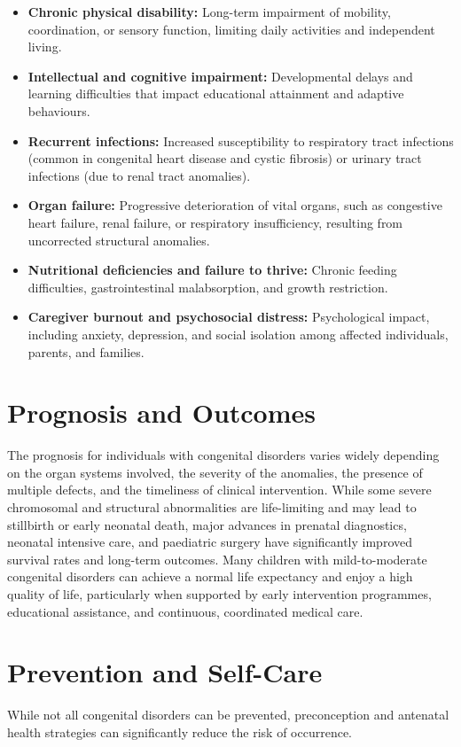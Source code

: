 \begin{itemize}
    \item \textbf{Chronic physical disability:} Long-term impairment of mobility, coordination, or sensory function, limiting daily activities and independent living.
    \item \textbf{Intellectual and cognitive impairment:} Developmental delays and learning difficulties that impact educational attainment and adaptive behaviours.
    \item \textbf{Recurrent infections:} Increased susceptibility to respiratory tract infections (common in congenital heart disease and cystic fibrosis) or urinary tract infections (due to renal tract anomalies).
    \item \textbf{Organ failure:} Progressive deterioration of vital organs, such as congestive heart failure, renal failure, or respiratory insufficiency, resulting from uncorrected structural anomalies.
    \item \textbf{Nutritional deficiencies and failure to thrive:} Chronic feeding difficulties, gastrointestinal malabsorption, and growth restriction.
    \item \textbf{Caregiver burnout and psychosocial distress:} Psychological impact, including anxiety, depression, and social isolation among affected individuals, parents, and families.
\end{itemize}

\section*{Prognosis and Outcomes}
The prognosis for individuals with congenital disorders varies widely depending on the organ systems involved, the severity of the anomalies, the presence of multiple defects, and the timeliness of clinical intervention. While some severe chromosomal and structural abnormalities are life-limiting and may lead to stillbirth or early neonatal death, major advances in prenatal diagnostics, neonatal intensive care, and paediatric surgery have significantly improved survival rates and long-term outcomes. Many children with mild-to-moderate congenital disorders can achieve a normal life expectancy and enjoy a high quality of life, particularly when supported by early intervention programmes, educational assistance, and continuous, coordinated medical care.

\section*{Prevention and Self-Care}
While not all congenital disorders can be prevented, preconception and antenatal health strategies can significantly reduce the risk of occurrence.

